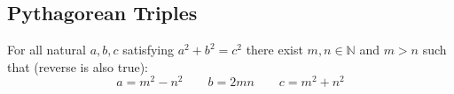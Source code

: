 \subsection{Pythagorean Triples}

For all natural $a, b, c$ satisfying $a^2 + b^2 = c^2$ there exist $m, n \in \mathbb{N}$ and $m > n$ such that (reverse is also true):
$$a = m^2 - n^2 \qquad b = 2mn \qquad c = m^2 + n^2$$
